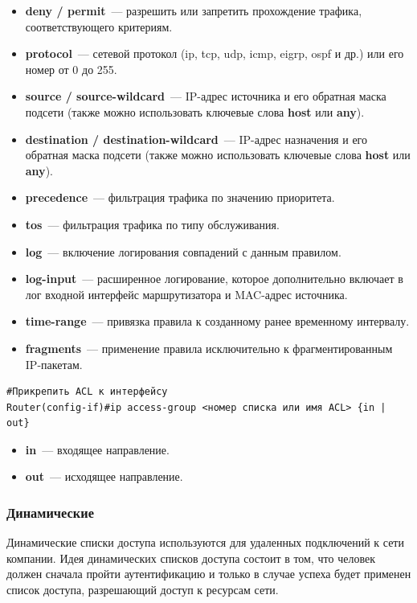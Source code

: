 	\begin{itemize}
		\item \textbf{deny / permit}~--- разрешить или запретить прохождение трафика, соответствующего критериям.
		\item \textbf{protocol}~--- сетевой протокол (ip, tcp, udp, icmp, eigrp, ospf и др.) или его номер от 0 до 255.
		\item \textbf{source / source-wildcard}~--- IP-адрес источника и его обратная маска подсети (также можно использовать ключевые слова \textbf{host} или \textbf{any}).
		\item \textbf{destination / destination-wildcard}~--- IP-адрес назначения и его обратная маска подсети (также можно использовать ключевые слова \textbf{host} или \textbf{any}).
		\item \textbf{precedence}~--- фильтрация трафика по значению приоритета.
		\item \textbf{tos}~--- фильтрация трафика по типу обслуживания.
		\item \textbf{log}~--- включение логирования совпадений с данным правилом.
		\item \textbf{log-input}~--- расширенное логирование, которое дополнительно включает в лог входной интерфейс маршрутизатора и MAC-адрес источника.
		\item \textbf{time-range}~--- привязка правила к созданному ранее временному интервалу.
		\item \textbf{fragments}~--- применение правила исключительно к фрагментированным IP-пакетам.
	\end{itemize}
	
	\begin{verbatim}
#Прикрепить ACL к интерфейсу
Router(config-if)#ip access-group <номер списка или имя ACL> {in | out}
	\end{verbatim}
	
	\begin{itemize}
		\item \textbf{in}~--- входящее направление.
		\item \textbf{out}~--- исходящее направление.
		
	\end{itemize}
	
	\subsubsection*{Динамические}
	Динамические списки доступа используются для удаленных подключений к сети компании. Идея динамических списков доступа состоит в том, что человек должен сначала пройти аутентификацию и только в случае успеха будет применен список доступа, разрешающий доступ к ресурсам сети.
	
